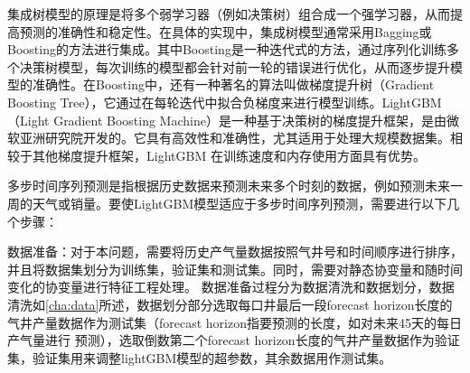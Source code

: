 集成树模型的原理是将多个弱学习器（例如决策树）组合成一个强学习器，从而提高预测的准确性和稳定性。在具体的实现中，集成树模型通常采用Bagging或Boosting的方法进行集成。其中Boosting是一种迭代式的方法，通过序列化训练多个决策树模型，每次训练的模型都会针对前一轮的错误进行优化，从而逐步提升模型的准确性。在Boosting中，还有一种著名的算法叫做梯度提升树（Gradient Boosting Tree），它通过在每轮迭代中拟合负梯度来进行模型训练。LightGBM（Light Gradient Boosting Machine）是一种基于决策树的梯度提升框架，是由微软亚洲研究院开发的。它具有高效性和准确性，尤其适用于处理大规模数据集。相较于其他梯度提升框架，LightGBM 在训练速度和内存使用方面具有优势。

多步时间序列预测是指根据历史数据来预测未来多个时刻的数据，例如预测未来一周的天气或销量。要使LightGBM模型适应于多步时间序列预测，需要进行以下几个步骤：

数据准备：对于本问题，需要将历史产气量数据按照气井号和时间顺序进行排序，并且将数据集划分为训练集，验证集和测试集。同时，需要对静态协变量和随时间变化的协变量进行特征工程处理。
数据准备过程分为数据清洗和数据划分，数据清洗如\ref{cha:data}所述，数据划分部分选取每口井最后一段forecast horizon长度的气井产量数据作为测试集（forecast horizon指要预测的长度，如对未来45天的每日产气量进行
预测），选取倒数第二个forecast horizon长度的气井产量数据作为验证集，验证集用来调整lightGBM模型的超参数，其余数据用作测试集。

